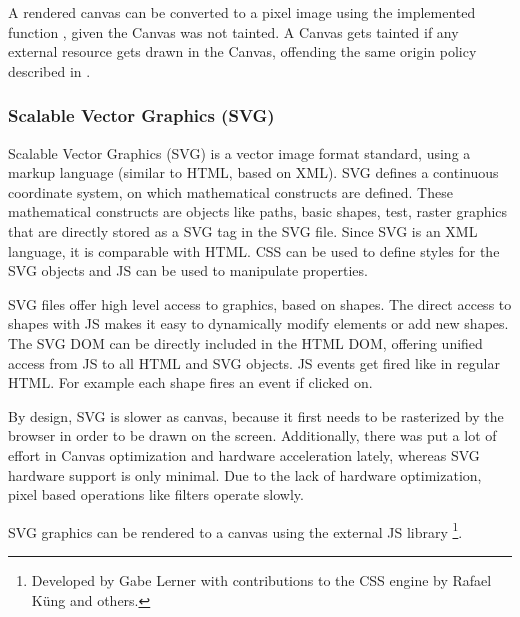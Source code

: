 A rendered canvas can be converted to a pixel image using the implemented function , given the Canvas was not tainted.
A Canvas gets tainted if any external resource gets drawn in the Canvas, offending the same origin policy described in .

\subsubsection{Scalable Vector Graphics (SVG)}
\label{sec:svg}

Scalable Vector Graphics (SVG) is a vector image format standard, using a markup language (similar to HTML, based on XML).
SVG defines a continuous coordinate system, on which mathematical constructs are defined.
These mathematical constructs are objects like paths, basic shapes, test, raster graphics that are directly stored as a SVG tag in the SVG file.
Since SVG is an XML language, it is comparable with HTML.
CSS can be used to define styles for the SVG objects and JS can be used to manipulate properties.

SVG files offer high level access to graphics, based on shapes.
The direct access to shapes with JS makes it easy to dynamically modify elements or add new shapes.
The SVG DOM can be directly included in the HTML DOM, offering unified access from JS to all HTML and SVG objects.
JS events get fired like in regular HTML.
For example each shape fires an  event if clicked on.


By design, SVG is slower as canvas, because it first needs to be rasterized by the browser in order to be drawn on the screen.
Additionally, there was put a lot of effort in Canvas optimization and hardware acceleration lately, whereas SVG hardware support is only minimal.
Due to the lack of hardware optimization, pixel based operations like filters operate slowly.

SVG graphics can be rendered to a canvas using the external JS library \footnote{Developed by Gabe Lerner with contributions to the CSS engine by Rafael Küng and others.}.





